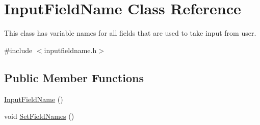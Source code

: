 \hypertarget{classInputFieldName}{\section{Input\-Field\-Name Class Reference}
\label{classInputFieldName}
}


This class has variable names for all fields that are used to take input from user.  




{\ttfamily \#include $<$inputfieldname.\-h$>$}

\subsection*{Public Member Functions}
\begin{DoxyCompactItemize}
\item 
\hyperlink{classInputFieldName_a185ace189c56eed847111756922e5158}{Input\-Field\-Name} ()
\item 
void \hyperlink{classInputFieldName_a5232eb098c6354207a97264cbc14a3fa}{Set\-Field\-Names} ()
\end{DoxyCompactItemize}
